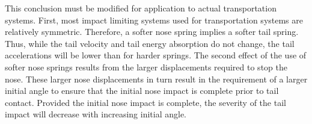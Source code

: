 This conclusion must be modified for
application to actual transportation systems.  First,
most impact limiting systems used for
transportation systems
are relatively symmetric.  Therefore, a softer
nose spring implies a softer tail spring.  Thus,
while the tail velocity and tail energy absorption do not
change, the tail accelerations will be lower than for harder
springs.  The second effect of the use of softer nose springs results
from the larger displacements required to stop the nose.  These larger
nose displacements in turn result in the requirement of a larger
initial angle to ensure that the initial nose impact is complete prior
to tail contact.  Provided the initial nose impact is complete, the
severity of the tail impact will decrease with increasing
initial angle.
